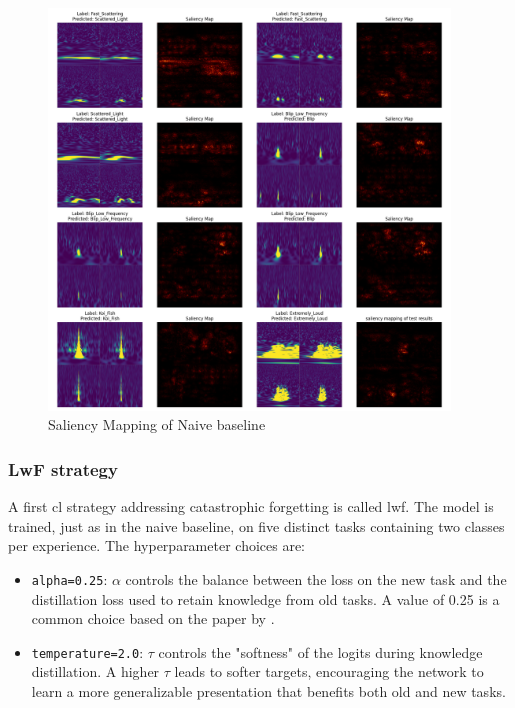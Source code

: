 \begin{figure}
    \centering
    \includegraphics[width=0.95\textwidth]{Grad Assignment/Images/SaliencyMapping_Naive_MultiView_100epochs.png}
    \caption{Saliency Mapping of Naive baseline}
    \label{fig:saliency_naive_baseline}
\end{figure}

\newpage
\subsubsection{LwF strategy}
\label{subsubsec:RQ1_LWF}
A first \acrshort{cl} strategy addressing catastrophic forgetting is called \acrfull{lwf}. The model is trained, just as in the naive baseline, on five distinct tasks containing two classes per experience. 
The hyperparameter choices are: 
\begin{itemize}
    \item \verb|alpha=0.25|: $\alpha$ controls the balance between the loss on the new task and the distillation loss used to retain knowledge from old tasks. A value of 0.25 is a common choice based on the paper by \citep{oren2021defense}. 
    \item \verb|temperature=2.0|: $\tau$ controls the "softness" of the logits during knowledge distillation. A higher $\tau$ leads to softer targets, encouraging the network to learn a more generalizable presentation that benefits both old and new tasks. 
\end{itemize}

